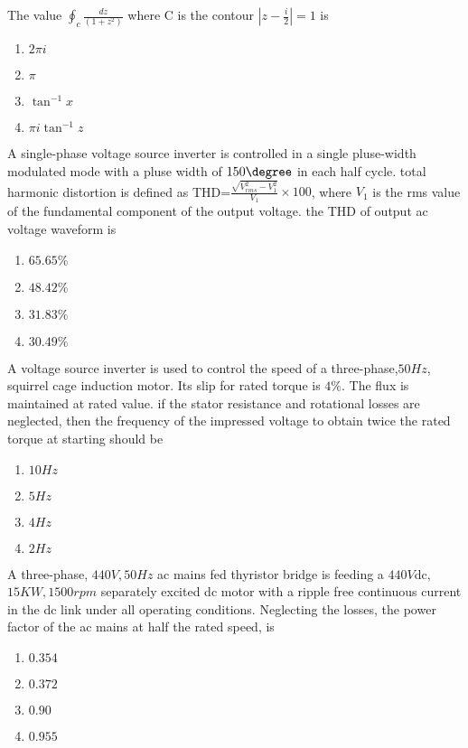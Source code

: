 \item The value $\oint_c \frac{dz}{(1+z^2)}$ where C is the contour $|z-\frac{i}{2}|=1$ is 
\begin{enumerate}
    \item $2\pi i$
    \item $\pi$
    \item $\tan^{-1}x$
    \item $\pi i \tan^{-1}z$\\
\end{enumerate}

\item A single-phase voltage source inverter is controlled in a single pluse-width modulated mode with a pluse width of $150\degree$ in each half cycle. total harmonic distortion is defined as THD=$\frac{\sqrt{V_{rms}^2-V_1^2}}{V_1}\times 100$, where $V_1$ is the rms value of the fundamental component of the output voltage. the THD of output ac voltage waveform is 
\begin{enumerate}
    \item $65.65\% $
    \item $48.42\%$
    \item $31.83\% $
    \item $30.49 \%$\\
\end{enumerate}

\item A voltage source inverter is used to control the speed of a three-phase,$50 Hz$, squirrel cage induction motor. Its slip for rated torque is $4\%$. The flux is maintained at rated value. if the stator resistance and rotational losses are neglected, then the frequency of the impressed voltage to obtain twice the rated torque at starting should be 
\begin{enumerate}
    \item $10 Hz$
    \item $5 Hz$
    \item $4 Hz$
    \item $2 Hz$\\
\end{enumerate}

\item A three-phase, $440V,50 Hz$ ac mains fed thyristor bridge is feeding a $440 V $dc, $15 KW, 1500 rpm$ separately excited dc motor with a ripple free continuous current in the dc link under all operating conditions. Neglecting the losses, the power factor of the ac mains at half the rated speed, is 
\begin{enumerate}
    \item $0.354$
    \item $0.372$
    \item $0.90$
    \item $0.955$\\
\end{enumerate}

